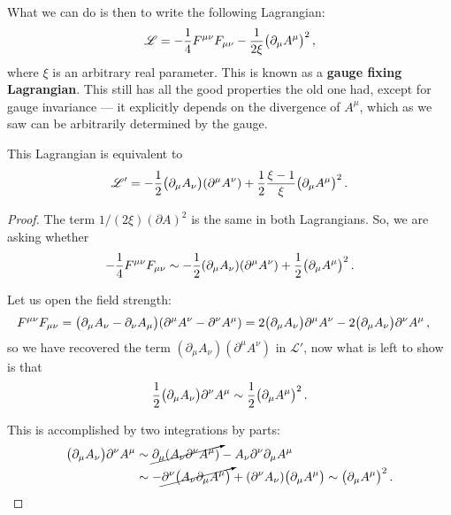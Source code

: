\documentclass[main.tex]{subfiles}
\begin{document}
What we can do is then to write the following Lagrangian: 
%
\begin{align}
\mathscr{L} = - \frac{1}{4} F^{\mu \nu } F_{\mu \nu } - \frac{1}{2 \xi } 
\qty(\partial_{\mu } A^{\mu })^2
\,,
\end{align}
%
where \(\xi \) is an arbitrary real parameter. This is known as a \textbf{gauge fixing Lagrangian}. This still has all the good properties the old one had, except for gauge invariance --- it explicitly depends on the divergence of \(A^{\mu }\), which as we saw can be arbitrarily determined by the gauge. 

\begin{claim}
This Lagrangian is equivalent to 
%
\begin{align}
\mathscr{L}' = - \frac{1}{2} \qty(\partial_{\mu } A_{\nu })\qty(\partial^{\mu }A^{\nu }) + \frac{1}{2} \frac{\xi-1}{\xi } \qty(\partial_{\mu } A^{\mu })^2
\,.
\end{align}
\end{claim}

\begin{proof}
The term \(1/(2\xi) (\partial A)^2 \) is the same in both Lagrangians. So, we are asking whether 
%
\begin{align}
- \frac{1}{4} F^{\mu \nu} F_{\mu \nu } \sim -\frac{1}{2} (\partial_{\mu } A_{\nu }) \qty(\partial^{\mu } A^{\nu }) + \frac{1}{2} \qty(\partial_{\mu } A^{\mu })^2
\,.
\end{align}

Let us open the field strength: 
%
\begin{align}
F^{\mu \nu } F_{\mu \nu } =
\qty(\partial_{\mu } A_{\nu } - \partial_{\nu } A_{\mu })
\qty(\partial^{\mu } A^{\nu } - \partial^{\nu } A^{\mu })
&= 2 \qty(\partial_{\mu } A_{\nu }) \partial^{\mu} A^{\nu }
- 2 \qty(\partial_{\mu } A_{\nu }) \partial^{\nu }A^{\mu }  
\,,
\end{align}
%
so we have recovered the term \((\partial_{\mu } A_{\nu })(\partial^{\mu } A^{\nu })\) in \(\mathscr{L}'\), now what is left to show is that 
%
\begin{align}
\frac{1}{2} \qty(\partial_{\mu } A_{\nu }) \partial^{\nu }A^{\mu }  
\sim \frac{1}{2} \qty(\partial_{\mu } A^{\mu })^2
\,.
\end{align}

This is accomplished by two integrations by parts: 
%
\begin{align}
\qty(\partial_{\mu } A_{\nu }) \partial^{\nu }A^{\mu }
&\sim \cancelto{}{\partial_{\mu } \qty(A_{\nu } \partial^{\nu } A^{\mu })}
- A_{\nu} \partial^{\nu }\partial_{\mu } A^{\mu }   \\
&\sim
-\cancelto{}{\partial^{\nu } \qty(A_{\nu } \partial_{\mu }A^{\mu })}
+ \qty(\partial^{\nu } A_{\nu }) \qty(\partial_{\mu }A^{\mu })
\sim
 \qty(\partial_{\mu }A^{\mu })^2
\,.
\end{align}
\end{proof}
\end{document}
